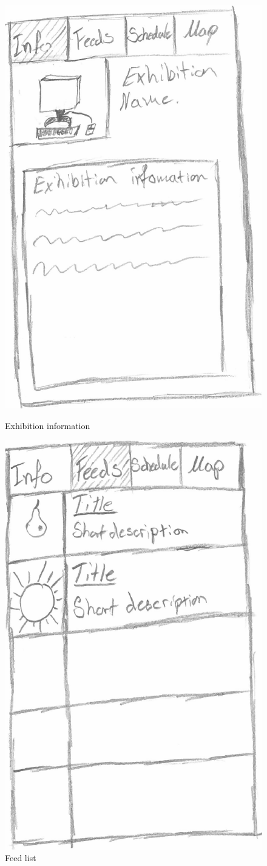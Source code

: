 \begin{figure}[H]
\begin{minipage}[b]{0.5\columnwidth}
\centering
\includegraphics[width=0.7\columnwidth]{img/prototype/3.png}
\caption{Exhibition information\label{fig:exhibition}}
\end{minipage}
\hspace{0.5cm}
\begin{minipage}[b]{0.5\columnwidth}
\centering
\includegraphics[width=0.7\columnwidth]{img/prototype/4.png}
\caption{Feed list\label{fig:feedlist}}
\end{minipage}
\end{figure}

